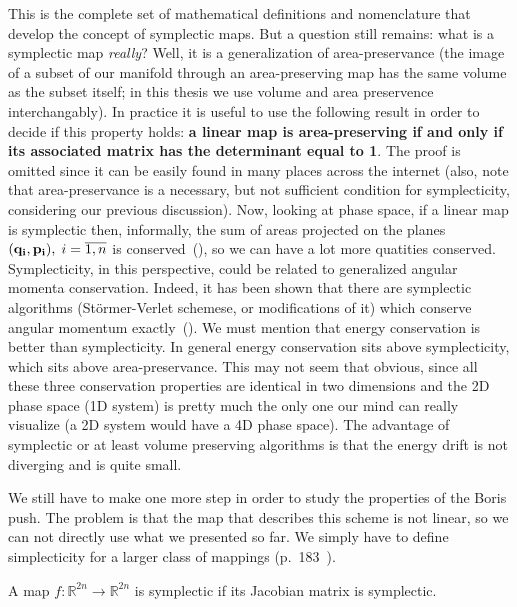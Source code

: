 \documentclass[12pt, class=report, crop=false]{standalone}
\begin{document}
This is the complete set of mathematical definitions and nomenclature that develop the concept of symplectic maps. But a question still remains: what is a symplectic map \textit{really}? Well, it is a generalization of area-preservance (the image of a subset of our manifold through an area-preserving map has the same volume as the subset itself; in this thesis we use volume and area preservence interchangably). In practice it is useful to use the following result in order to decide if this property holds: \textbf{a linear map is area-preserving if and only if its associated matrix has the determinant equal to 1}. The proof is omitted since it can be easily found in many places across the internet (also, note that area-preservance is a necessary, but not sufficient condition for symplecticity, considering our previous discussion). Now, looking at phase space, if a linear map is symplectic then, informally, the sum of areas projected on the planes \((\vb{q_i},\vb{p_i}),\;i = \overline{1,n}\) is conserved~(\cite{weissteinSymplecticMap}), so we can have a lot more quatities conserved. Symplecticity, in this perspective, could be related to generalized angular momenta conservation. Indeed, it has been shown that there are symplectic algorithms (Störmer-Verlet schemese, or modifications of it) which conserve angular momentum exactly~(\cite{zhangSymplecticIntegratorsConservation1995}). We must mention that energy conservation is better than symplecticity. In general energy conservation sits above symplecticity, which sits above area-preservance. This may not seem that obvious, since all these three conservation properties are identical in two dimensions and the 2D phase space (1D system) is pretty much the only one our mind can really visualize (a 2D system would have a 4D phase space). The advantage of symplectic or at least volume preserving algorithms is that the energy drift is not diverging and is quite small.

We still have to make one more step in order to study the properties of the Boris push. The problem is that the map that describes this scheme is not linear, so we can not directly use what we presented so far. We simply have to define simplecticity for a larger class of mappings (p.~183~\cite{hairerGeometricNumericalIntegration2006}).

\begin{definition}
  A map \(f:\mathbb{R}^{2n}\rightarrow \mathbb{R}^{2n}\) is symplectic if its Jacobian matrix is symplectic.
\end{definition}
\end{document}
